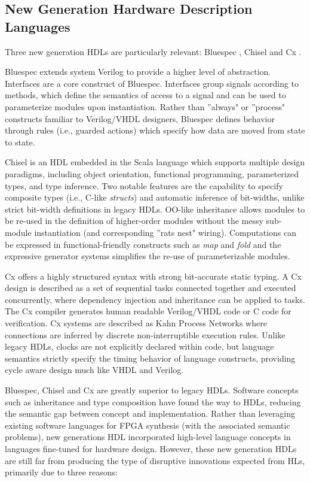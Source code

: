 \subsection{New Generation Hardware Description Languages}
Three new generation HDLs are particularly relevant: Bluespec \cite{nikhil2004bluespec}, Chisel \cite{bachrach2012chisel} and Cx \cite{Cx_page}.
\par Bluespec extends system Verilog to provide a higher level of abstraction. Interfaces are a core construct of Bluespec. Interfaces group signals according to methods, which define the semantics of access to a signal and can be used to parameterize modules upon instantiation. Rather than ''always" or ''process" constructs familiar to Verilog/VHDL designers, Bluespec defines behavior through rules (i.e., guarded actions) which specify how data are moved from state to state. 
\par Chisel is an HDL embedded in the Scala language which supports multiple design paradigms, including object orientation,
functional programming, parameterized types, and type inference. Two notable features are the capability to specify composite types (i.e., C-like \textit{structs}) and automatic inference of bit-widths, unlike strict bit-width definitions in legacy HDLs.
OO-like inheritance allows modules to be re-used in the definition of higher-order modules without the messy sub-module instantiation (and corresponding ''rats nest" wiring). Computations can be expressed in functional-friendly constructs such as \textit{map} and \textit{fold} and the expressive generator systems simplifies the re-use of parameterizable modules.
\par Cx offers a highly structured syntax with strong bit-accurate static typing. A Cx design is described as a set of sequential tasks connected together and executed concurrently, where dependency injection and inheritance can be applied to tasks. The Cx compiler generates human readable Verilog/VHDL code or C code for verification. Cx systems are described as Kahn Process Networks \cite{edwards2000kahn} where connections are inferred by discrete non-interruptible execution rules. Unlike legacy HDLs, clocks are not explicitly declared within code, but language semantics strictly specify the timing behavior of language constructs, providing cycle aware design much like VHDL and Verilog. 
\par Bluespec, Chisel and Cx are greatly superior to legacy HDLs. Software concepts such as inheritance and type composition have found the way to HDLs, reducing the semantic gap between concept and implementation. Rather than leveraging existing software languages for FPGA synthesis (with the associated semantic problems), new generations HDL incorporated high-level language concepts in languages fine-tuned for hardware design. However, these new generation HDLs are still far from producing the type of disruptive innovations expected from HLs, primarily due to three reasons:

